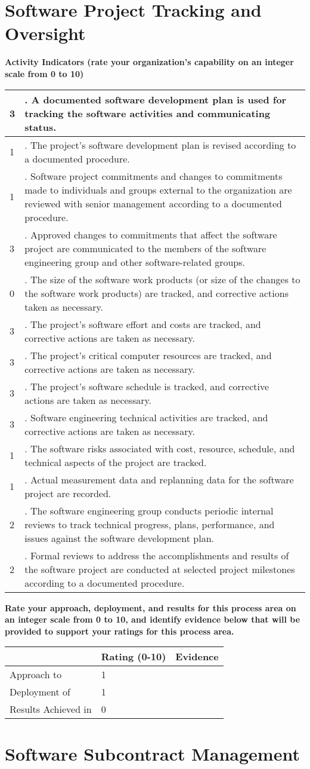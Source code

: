\documentclass{article}
\newcommand{\KPAname}{}
\newenvironment{KPARate}[1]
	{\renewcommand{\KPAname}{#1}
	 {\bf Rate your approach, deployment, and results for
	  this process area on an integer scale from 0 to 10, and 
	  identify evidence below that will be provided to support your
	  ratings for this process area.}
	 \begin{center}
	 \begin{tabular}{|p{1.0in}|p{0.5in}|p{5.0in}|} \hline
	 & Rating (0-10) & \multicolumn{1}{c|}{Evidence} \\ \hline}
	{\end{tabular}
	 \end{center}}
\newcommand{\Approach}[2]{Approach to \KPAname & #1 & #2 \\ \hline}
\newcommand{\Deployment}[2]{Deployment of \KPAname & #1 & #2 \\ \hline}
\newcommand{\Results}[2]{Results Achieved in \KPAname & #1 & #2 \\
	\hline}
\newcounter{activity}
\newenvironment{KPAActivity}
	{
	 \setcounter{activity}{0}
	 {\bf Activity Indicators (rate your organization's capability
	 on an integer scale from 0 to 10)}
	 \begin{center}
	 \begin{tabular}{|p{0.5in}|p{6.0in}|} \hline
	}
	{
	 \end{tabular}
	 \end{center}
	}
\newcommand{\Activity}[2]{\stepcounter{activity} #1 &
\arabic{activity}. #2 \\ \hline}
\begin{document}
\newpage
\section{Software Project Tracking and Oversight}

\begin{KPAActivity}
\Activity{3}{A documented software development plan is used for
tracking the software activities and communicating status.}
\Activity{1}{The project's software development plan is revised
according to a documented procedure.}
\Activity{1}{Software project commitments and changes to
commitments made to individuals and groups external to the
organization are reviewed with senior management according to a
documented procedure.}
\Activity{3}{Approved changes to commitments that affect the
software project are communicated to the members of the software
engineering group and other software-related groups.}
\Activity{0}{The size of the software work products (or size of the
changes to the software work products) are tracked, and corrective
actions taken as necessary.}
\Activity{3}{The project's software effort and costs are tracked,
and corrective actions are taken as necessary.}
\Activity{3}{The project's critical computer resources are tracked,
and corrective actions are taken as necessary.}
\Activity{3}{The project's software schedule is tracked, and
corrective actions are taken as necessary.}
\Activity{3}{Software engineering technical activities are tracked,
and corrective actions are taken as necessary.}
\Activity{1}{The software risks associated with cost, resource,
schedule, and technical aspects of the project are tracked.}
\Activity{1}{Actual measurement data and replanning data for the
software project are recorded.}
\Activity{2}{The software engineering group conducts periodic
internal reviews to track technical progress, plans, performance, and
issues against the software development plan.}
\Activity{2}{Formal reviews to address the accomplishments and
results of the software project are conducted at selected project
milestones according to a documented procedure.} 
\end{KPAActivity}

\begin{KPARate}{Software Project Tracking and Oversight}
\Approach{1}{}
\Deployment{1}{}
\Results{0}{}
\end{KPARate}

\newpage
\section{Software Subcontract Management}
\end{document}
